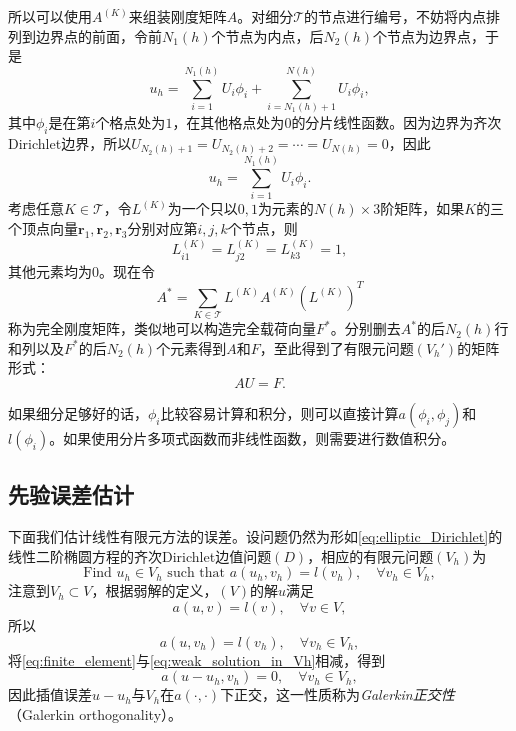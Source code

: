 \documentclass[a4paper,10pt]{ctexart}
\begin{document}
所以可以使用$ A^{(K)} $来组装刚度矩阵$ A $。对细分$ \mathcal{T} $的节点进行编号，不妨将内点排列到边界点的前面，令前$ N_1(h) $个节点为内点，后$ N_2(h) $个节点为边界点，于是
\[
    u_h = \sum_{i=1}^{N_1(h)} U_i\phi_i + \sum_{i=N_1(h)+1}^{N(h)} U_i\phi_i,
\]
其中$ \phi_i $是在第$ i $个格点处为$ 1 $，在其他格点处为$ 0 $的分片线性函数。因为边界为齐次Dirichlet边界，所以$ U_{N_2(h)+1} = U_{N_2(h)+2} = \cdots = U_{N(h)} = 0 $，因此
\[
    u_h = \sum_{i=1}^{N_1(h)} U_i\phi_i.
\]
考虑任意$ K\in \mathcal{T} $，令$ L^{(K)} $为一个只以$ 0,1 $为元素的$ N(h)\times 3 $阶矩阵，如果$ K $的三个顶点向量$ \bm{r}_1,\bm{r}_2,\bm{r}_3 $分别对应第$ i,j,k $个节点，则
\[
    L^{(K)}_{i1} = L^{(K)}_{j2} = L^{(K)}_{k3} = 1,
\]
其他元素均为$ 0 $。现在令
\begin{equation}
    A^* = \sum_{K\in \mathcal{T}} L^{(K)} A^{(K)} (L^{(K)})^T
\end{equation}
称为完全刚度矩阵，类似地可以构造完全载荷向量$ F^* $。分别删去$ A^* $的后$ N_2(h) $行和列以及$ F^* $的后$ N_2(h) $个元素得到$ A $和$ F $，至此得到了有限元问题$ (V_h') $的矩阵形式：
\begin{equation}
    AU = F.
\end{equation}

如果细分足够好的话，$ \phi_i $比较容易计算和积分，则可以直接计算$ a(\phi_i,\phi_j) $和$ l(\phi_i) $。如果使用分片多项式函数而非线性函数，则需要进行数值积分。

\subsection{先验误差估计}
下面我们估计线性有限元方法的误差。设问题仍然为形如\eqref{eq:elliptic_Dirichlet}的线性二阶椭圆方程的齐次Dirichlet边值问题$ (D) $，相应的有限元问题$ (V_h) $为
\begin{equation}\label{eq:finite_element}
    \text{Find } u_h\in V_h \text{ such that } a(u_h,v_h) = l(v_h),\quad \forall v_h\in V_h,
\end{equation}
注意到$ V_h\subset V $，根据弱解的定义，$ (V) $的解$ u $满足
\[
    a(u,v) = l(v),\quad \forall v\in V,
\]
所以
\begin{equation}\label{eq:weak_solution_in_Vh}
    a(u,v_h) = l(v_h),\quad \forall v_h\in V_h,
\end{equation}
将\eqref{eq:finite_element}与\eqref{eq:weak_solution_in_Vh}相减，得到
\begin{equation}\label{eq:Galerkin_orthogonality}
    a(u-u_h,v_h) = 0,\quad \forall v_h\in V_h,
\end{equation}
因此插值误差$ u-u_h $与$ V_h $在$ a(\cdot,\cdot) $下正交，这一性质称为\emph{Galerkin正交性}（Galerkin orthogonality）。
\end{document}
